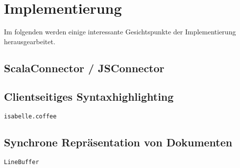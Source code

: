 \chapter{Implementierung}
\label{sec:imp}

Im folgenden werden einige interessante Gesichtspunkte der Implementierung herausgearbeitet.


\section{ScalaConnector / JSConnector}
\label{sec:jsc}

\section{Clientseitiges Syntaxhighlighting}

\texttt{isabelle.coffee}

\section{Synchrone Repräsentation von Dokumenten}

\texttt{LineBuffer}